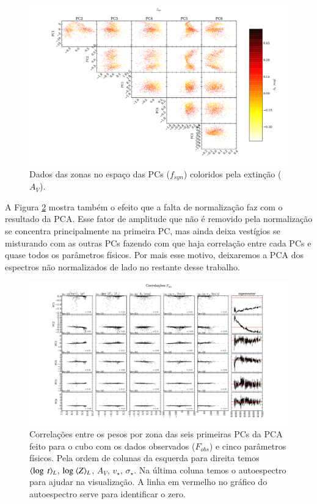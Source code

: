 \begin{figure}
	\includegraphics[width=1.3\textwidth, angle=-90]{figuras/K0277-f_syn_norm-corre_PCxPC_AV.pdf}
	\caption[Dados no espaço das PCs vs AV- $f_{syn}$.]
    {Dados das zonas no espaço das PCs ($f_{syn}$) coloridos pela extinção ($A_V$).}
    \label{fig:K0277correfsynnormPCvsPC:AV}	
\end{figure}

A Figura \ref{fig:K0277correfobs} mostra também o efeito que a falta de normalização faz com o resultado da PCA. Esse
fator de amplitude que não é removido pela normalização se concentra principalmente na primeira PC, mas ainda deixa
vestígios se misturando com as outras PCs fazendo com que haja correlação entre cada PCs e quase todos os parâmetros
físicos. Por mais esse motivo, deixaremos a PCA dos espectros não normalizados de lado no restante desse trabalho.

\begin{figure}
    \includegraphics[width=1.2\textwidth, angle=-90]{figuras/K0277-correl-f_obs-PCvsPhys.pdf}
	\caption[Correlações PCs vs. par\^ametros f\'isicos - $F_{obs}$.]
    {Correlações entre os pesos por zona das seis primeiras PCs da PCA feito para o cubo com os dados observados
    ($F_{obs}$) e cinco parâmetros físicos. Pela ordem de colunas da esquerda para direita temos $\meanL{\log\
    t}$, $\log\ \meanL{Z}$, $A_V$, $v_{\star}$, $\sigma_{\star}$. Na última coluna temos o autoespectro para ajudar na
    visualização. A linha em vermelho no gráfico do autoespectro serve para identificar o zero.}
    \label{fig:K0277correfobs}
\end{figure}

